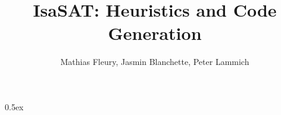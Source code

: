 \documentclass[11pt,a4paper]{book}
\begin{document}
\title{IsaSAT: Heuristics and Code Generation}
\author{Mathias Fleury, Jasmin Blanchette, Peter Lammich}
\maketitle

\tableofcontents

\parindent 0pt\parskip 0.5ex



%
%
\end{document}
